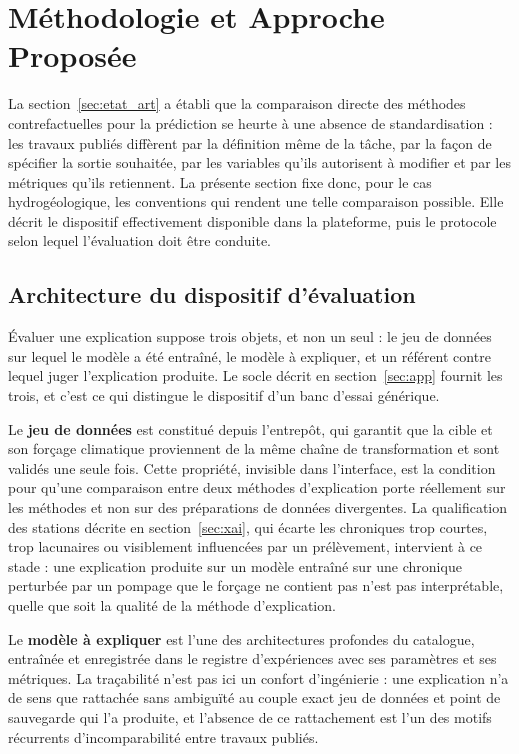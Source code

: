 \newpage
\section{Méthodologie et Approche Proposée}
\label{sec:methodo}

La section~\ref{sec:etat_art} a établi que la comparaison directe des méthodes contrefactuelles pour la prédiction se heurte à une absence de standardisation : les travaux publiés diffèrent par la définition même de la tâche, par la façon de spécifier la sortie souhaitée, par les variables qu'ils autorisent à modifier et par les métriques qu'ils retiennent. La présente section fixe donc, pour le cas hydrogéologique, les conventions qui rendent une telle comparaison possible. Elle décrit le dispositif effectivement disponible dans la plateforme, puis le protocole selon lequel l'évaluation doit être conduite.

\subsection{Architecture du dispositif d'évaluation}

Évaluer une explication suppose trois objets, et non un seul : le jeu de données sur lequel le modèle a été entraîné, le modèle à expliquer, et un référent contre lequel juger l'explication produite. Le socle décrit en section~\ref{sec:app} fournit les trois, et c'est ce qui distingue le dispositif d'un banc d'essai générique.

Le \textbf{jeu de données} est constitué depuis l'entrepôt, qui garantit que la cible et son forçage climatique proviennent de la même chaîne de transformation et sont validés une seule fois. Cette propriété, invisible dans l'interface, est la condition pour qu'une comparaison entre deux méthodes d'explication porte réellement sur les méthodes et non sur des préparations de données divergentes. La qualification des stations décrite en section~\ref{sec:xai}, qui écarte les chroniques trop courtes, trop lacunaires ou visiblement influencées par un prélèvement, intervient à ce stade : une explication produite sur un modèle entraîné sur une chronique perturbée par un pompage que le forçage ne contient pas n'est pas interprétable, quelle que soit la qualité de la méthode d'explication.

Le \textbf{modèle à expliquer} est l'une des architectures profondes du catalogue, entraînée et enregistrée dans le registre d'expériences avec ses paramètres et ses métriques. La traçabilité n'est pas ici un confort d'ingénierie : une explication n'a de sens que rattachée sans ambiguïté au couple exact jeu de données et point de sauvegarde qui l'a produite, et l'absence de ce rattachement est l'un des motifs récurrents d'incomparabilité entre travaux publiés.

